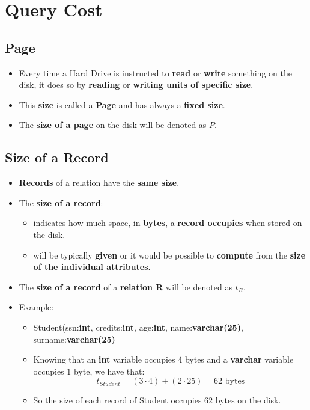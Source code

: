 \documentclass[10pt]{article}
\begin{document}
\section{Query Cost}
	\subsection{Page}
	\begin{itemize}
	\item
	Every time a Hard Drive is instructed to \textbf{read} or \textbf{write} something on the disk, it does so by \textbf{reading} or \textbf{writing units of specific size}.
	\item
	This \textbf{size} is called a \textbf{Page} and has always a \textbf{fixed size}.
	\item
	The \textbf{size of a page} on the disk will be denoted as $P$.
	\end{itemize}

\subsection{Size of a Record}
	\begin{itemize}
	\item
	\textbf{Records} of a relation have the \textbf{same size}.
	\item
	The \textbf{size of a record}:
		\begin{itemize}
		\item
		indicates how much space, in \textbf{bytes}, a \textbf{record occupies} when stored on the disk.
		\item
		will be typically \textbf{given} or it would be possible to \textbf{compute} from the \textbf{size of the individual attributes}.
		\end{itemize}
	\item
	The \textbf{size of a record} of a \textbf{relation R} will be denoted as $t_R$.
	\item
	Example:
		\begin{itemize}
		\item
		Student(ssn:\textbf{int}, credits:\textbf{int}, age:\textbf{int}, name:\textbf{varchar(25)}, surname:\textbf{varchar(25)}
		\item 
		Knowing that an \textbf{int} variable occupies $4$ bytes and a \textbf{varchar} variable occupies $1$ byte, we have that: $$t_{Student} = (3 \cdot 4) + (2 \cdot 25) = 62 \textrm{ bytes}$$
	\item
	So the size of each record of Student occupies $62$ bytes on the disk.
	\end{itemize}
\end{itemize}
\end{document}
